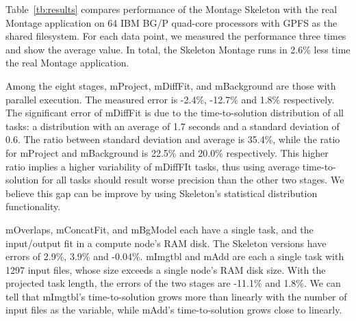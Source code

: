 \documentclass{sig-alternate}
\newcommand{\katznote}[1]{ {\textcolor{blue}    { ***Dan:      #1 }}}
\newcommand{\zhaonote}[1]{{\textcolor{darkgreen}    { ***Zhao:      #1 }}}
\newcommand{\katznote}[1]{}
\newcommand{\zhaonote}[1]{}
\begin{document}
Table~\ref{tb:results} compares performance of the Montage Skeleton with the real Montage application on 64
IBM BG/P quad-core processors with GPFS as the shared filesystem. For each data point, we measured the performance three
times and show the average value. In total, the Skeleton Montage runs in 2.6\% less time the real Montage application.

Among the eight stages, mProject, mDiffFit, and mBackground are those with parallel execution. The measured error is -2.4\%,
 -12.7\% and 1.8\% respectively. The significant error of mDiffFit is due to the time-to-solution distribution of all tasks: a distribution
with an average of 1.7 seconds and a standard deviation of 0.6. The ratio between standard deviation and average is 35.4\%, while the ratio
for mProject and mBackground is 22.5\% and 20.0\% respectively. This higher ratio implies a higher variability of mDiffFIt tasks, thus using
average time-to-solution for all tasks should result worse precision than the other two stages. We believe this gap can be improve by using Skeleton's
statistical distribution functionality. 

mOverlaps, mConcatFit, and mBgModel each have a single task, and the input/output fit in a compute node's RAM disk. The Skeleton
versions have errors of 2.9\%, 3.9\% and -0.04\%. 
mImgtbl and mAdd are each a single task with 1297 input files, whose size exceeds a single node's RAM disk size. 
With the projected task length, the errors of the two stages are
-11.1\% and 1.8\%. We can tell that mImgtbl's time-to-solution grows more than linearly with the number of input files as the variable, while
mAdd's time-to-solution grows close to linearly. 

\end{document}
